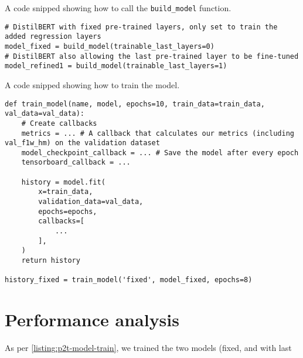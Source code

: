 \begin{listing*}
\caption{A code snipped showing how to call the \texttt{build\_model} function.}
\begin{verbatim}
# DistilBERT with fixed pre-trained layers, only set to train the added regression layers
model_fixed = build_model(trainable_last_layers=0)
# DistilBERT also allowing the last pre-trained layer to be fine-tuned
model_refined1 = build_model(trainable_last_layers=1)
\end{verbatim}
\label{listing:p2t-build-model-call}
\end{listing*}

\begin{listing*}
\caption{A code snipped showing how to train the model.}
\begin{verbatim}
def train_model(name, model, epochs=10, train_data=train_data, val_data=val_data):
    # Create callbacks
    metrics = ... # A callback that calculates our metrics (including val_f1w_hm) on the validation dataset
    model_checkpoint_callback = ... # Save the model after every epoch
    tensorboard_callback = ...

    history = model.fit(
        x=train_data,
        validation_data=val_data,
        epochs=epochs,
        callbacks=[
            ...
        ],
    )
    return history

history_fixed = train_model('fixed', model_fixed, epochs=8)
\end{verbatim}
\label{listing:p2t-model-train}
\end{listing*}


\section{Performance analysis}

As per \cref{listing:p2t-model-train}, we trained the two models (fixed, and with last 
